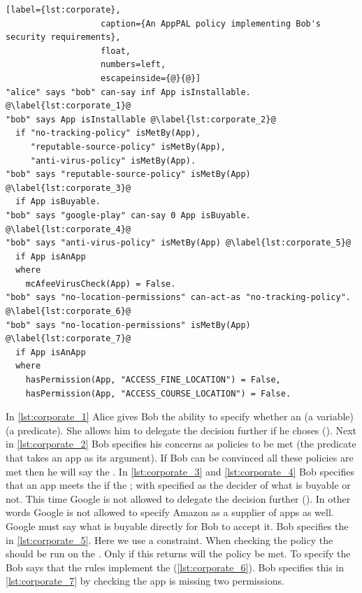\documentclass[a4paper]{scrartcl}
\begin{document}
\begin{lstlisting}[label={lst:corporate}, 
                   caption={An AppPAL policy implementing Bob's security requirements},
                   float,
                   numbers=left,
                   escapeinside={@}{@}]
"alice" says "bob" can-say inf App isInstallable. @\label{lst:corporate_1}@
"bob" says App isInstallable @\label{lst:corporate_2}@
  if "no-tracking-policy" isMetBy(App),
     "reputable-source-policy" isMetBy(App),
     "anti-virus-policy" isMetBy(App).
"bob" says "reputable-source-policy" isMetBy(App) @\label{lst:corporate_3}@
  if App isBuyable.
"bob" says "google-play" can-say 0 App isBuyable. @\label{lst:corporate_4}@
"bob" says "anti-virus-policy" isMetBy(App) @\label{lst:corporate_5}@
  if App isAnApp
  where
    mcAfeeVirusCheck(App) = False.
"bob" says "no-location-permissions" can-act-as "no-tracking-policy". @\label{lst:corporate_6}@
"bob" says "no-location-permissions" isMetBy(App) @\label{lst:corporate_7}@
  if App isAnApp
  where
    hasPermission(App, "ACCESS_FINE_LOCATION") = False,
    hasPermission(App, "ACCESS_COURSE_LOCATION") = False.
\end{lstlisting}

In \autoref{lst:corporate_1} Alice gives Bob the ability to specify whether an  (a variable)  (a predicate).
She allows him to delegate the decision further if he choses ().
Next in \autoref{lst:corporate_2} Bob specifies his concerns as policies to be met (the  predicate that takes an app as its argument).
If Bob can be convinced all these policies are met then he will say the .
In \autoref{lst:corporate_3} and \autoref{lst:corporate_4} Bob specifies that an app meets the  if the ;
  with  specified as the decider of what is buyable or not.
This time Google is not allowed to delegate the decision further ().
In other words Google is not allowed to specify Amazon as a supplier of apps as well.
Google must say what is buyable directly for Bob to accept it.
Bob specifies the  in \autoref{lst:corporate_5}.
Here we use a constraint.
When checking the policy the  should be run on the .
Only if this returns  will the policy be met.
To specify the  Bob says that the  rules implement the  (\autoref{lst:corporate_6}).
Bob specifies this in \autoref{lst:corporate_7} by checking the app is missing two permissions.
\end{document}
